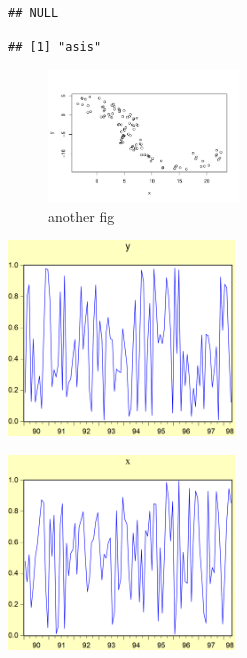 \documentclass[
]{article}
\begin{document}
\begin{verbatim}
## NULL
\end{verbatim}

\begin{verbatim}
## [1] "asis"
\end{verbatim}

\begin{figure}[h]

{\centering \includegraphics[width=0.45\textwidth]{test_engEviews_files/figure-latex/labe-1} 

}

\caption{another fig}\label{fig:labe}
\end{figure}

\begin{center}\includegraphics[width=0.45\textwidth]{test_engEviews_files/figure-latex//eview-graph-y} \end{center}

\begin{center}\includegraphics[width=0.45\textwidth]{test_engEviews_files/figure-latex//eview-graph-x} \end{center}
\end{document}
